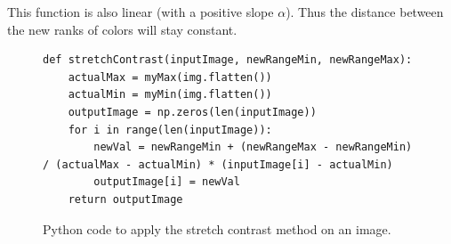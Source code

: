 \documentclass[a4paper]{article}
\begin{document}
    This function is also linear (with a positive slope $\alpha$).  Thus the distance between the new ranks of colors will stay constant.
    
    \begin{figure}[ht!]
    \lstset{language=Python}
    \begin{lstlisting}
def stretchContrast(inputImage, newRangeMin, newRangeMax):
    actualMax = myMax(img.flatten())
    actualMin = myMin(img.flatten())
    outputImage = np.zeros(len(inputImage))
    for i in range(len(inputImage)):
        newVal = newRangeMin + (newRangeMax - newRangeMin) / (actualMax - actualMin) * (inputImage[i] - actualMin)
        outputImage[i] = newVal
    return outputImage

    \end{lstlisting}
    \caption{Python code to apply the stretch contrast method on an image.}
    \label{stretchContrast.py}
	\end{figure}
\end{document}
